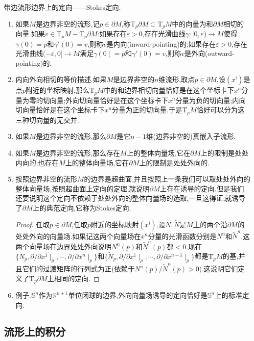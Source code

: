 带边流形边界上的定向——Stokes定向.
\begin{enumerate}
	\item 如果$M$是边界非空的流形,记$p\in\partial M$,称$\mathrm{T}_p\partial M\subset\mathrm{T}_pM$中的向量为和$\partial M$相切的向量.如果$v\in\mathrm{T}_pM-\mathrm{T}_p\partial M$:如果存在$\varepsilon>0$,存在光滑曲线$\gamma:[0,\varepsilon)\to M$使得$\gamma(0)=p$和$\gamma'(0)=v$,则称$v$是内向(inward-pointing)的;如果存在$\varepsilon>0$,存在光滑曲线$(-\varepsilon,0]\to M$满足$\gamma(0)=p$和$\gamma'(0)=v$,则称$v$是外向(outward-pointing)的.
	\item 内向外向相切的等价描述.如果$M$是边界非空的$n$维流形,取点$p\in\partial M$,设$(x^i)$是点$p$附近的坐标映射,那么$\mathrm{T}_pM$中的和边界相切向量恰好是在这个坐标卡下$x^n$分量为零的切向量;外向切向量恰好是在这个坐标卡下$x^n$分量为负的切向量;内向切向量恰好是在这个坐标卡下$x^n$分量为正的切向量.于是$\mathrm{T}_pM$恰好可以分为这三种切向量的无交并.
	\item 如果$M$是边界非空的流形,那么$\partial M$是它$n-1$维(边界非空的)真嵌入子流形.
	\item 如果$M$是边界非空的流形,那么存在$M$上的整体向量场,它在$\partial M$上的限制是处处内向的;也存在$M$上的整体向量场,它在$\partial M$上的限制是处处外向的.
	\item 按照边界非空的流形$M$的边界是超曲面,并且按照上一条我们可以取处处外向的整体向量场,按照超曲面上定向的定理,就说明$\partial M$上存在诱导的定向.但是我们还要说明这个定向不依赖于处处外向的整体向量场的选取,一旦这得证,就诱导了$\partial M$上的典范定向,它称为Stokes定向.
	\begin{proof}
		
		任取$p\in\partial M$,任取$p$附近的坐标映射$(x^i)$,设$N,\widetilde{N}$是$M$上的两个沿$\partial M$的处处外向的向量场.如果记这两个向量场在$x^n$分量的光滑函数分别是$N^n$和$\widetilde{N}^n$,这两个向量场在边界处处外向说明$N^n(p)$和$\widetilde{N}^n(p)$都$<0$.现在$\{N_p,\partial/\partial x^1\mid_p,\cdots,\partial/\partial x^n\mid_p\}$和$\{\widetilde{N}_p,\partial/\partial x^1\mid_p,\cdots,\partial/\partial x^{n-1}\mid_p\}$都是$\mathrm{T}_pM$的基,并且它们的过渡矩阵的行列式为正(依赖于$N^n(p)/\widetilde{N}^n(p)>0$).这说明它们定义了$\mathrm{T}_p\partial M$上相同的定向.
	\end{proof}
    \item 例子.$\mathbb{S}^n$作为$\mathbb{R}^{n+1}$单位闭球的边界,外向向量场诱导的定向恰好是$\mathbb{S}^n$上的标准定向.
\end{enumerate}
\subsection{流形上的积分}

